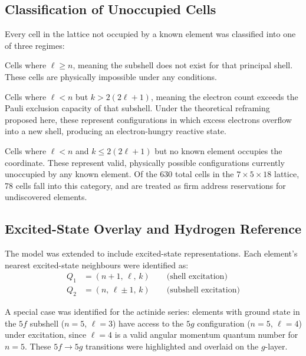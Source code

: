 \documentclass[12pt, a4paper]{article}
\begin{document}
\subsection{Classification of Unoccupied Cells}

Every cell in the lattice not occupied by a known element was classified into one of three
regimes:

\begin{description}[leftmargin=2em, style=nextline]
  \item[\textit{Void cells}]
    Cells where $\ell \ge n$, meaning the subshell does not exist for that principal shell.
    These cells are physically impossible under any conditions.

  \item[\textit{Reactive cells}]
    Cells where $\ell < n$ but $k > 2(2\ell+1)$, meaning the electron count exceeds the
    Pauli exclusion capacity of that subshell. Under the theoretical reframing proposed
    here, these represent configurations in which excess electrons overflow into a new
    shell, producing an electron-hungry reactive state.

  \item[\textit{Reserved cells}]
    Cells where $\ell < n$ and $k \le 2(2\ell+1)$ but no known element occupies the
    coordinate. These represent valid, physically possible configurations currently
    unoccupied by any known element. Of the 630 total cells in the
    $7 \times 5 \times 18$ lattice, 78 cells fall into this category, and are treated
    as firm address reservations for undiscovered elements.
\end{description}

\subsection{Excited-State Overlay and Hydrogen Reference}

The model was extended to include excited-state representations. Each element's nearest
excited-state neighbours were identified as:
\begin{align}
  Q_1 &= (n+1,\, \ell,\, k) \qquad \text{(shell excitation)} \\
  Q_2 &= (n,\, \ell \pm 1,\, k) \qquad \text{(subshell excitation)}
\end{align}

A special case was identified for the actinide series: elements with ground state in the
$5f$ subshell ($n=5$, $\ell=3$) have access to the $5g$ configuration ($n=5$, $\ell=4$)
under excitation, since $\ell=4$ is a valid angular momentum quantum number for $n=5$.
These $5f \to 5g$ transitions were highlighted and overlaid on the $g$-layer.
\end{document}
